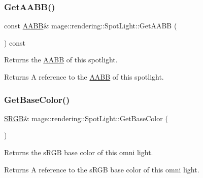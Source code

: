 \subsubsection{\texorpdfstring{Get\+A\+A\+B\+B()}{GetAABB()}}
{\footnotesize\ttfamily const \hyperlink{classmage_1_1_a_a_b_b}{A\+A\+BB}\& mage\+::rendering\+::\+Spot\+Light\+::\+Get\+A\+A\+BB (\begin{DoxyParamCaption}{ }\end{DoxyParamCaption}) const\hspace{0.3cm}{\ttfamily [noexcept]}}

Returns the \hyperlink{classmage_1_1_a_a_b_b}{A\+A\+BB} of this spotlight.

\begin{DoxyReturn}{Returns}
A reference to the \hyperlink{classmage_1_1_a_a_b_b}{A\+A\+BB} of this spotlight. 
\end{DoxyReturn}
\hypertarget{classmage_1_1rendering_1_1_spot_light_a77ad6869c08a8dce505f2fb110c0ee26}{}\label{classmage_1_1rendering_1_1_spot_light_a77ad6869c08a8dce505f2fb110c0ee26} 
\subsubsection{\texorpdfstring{Get\+Base\+Color()}{GetBaseColor()}\hspace{0.1cm}{\footnotesize\ttfamily [1/2]}}
{\footnotesize\ttfamily \hyperlink{structmage_1_1_s_r_g_b}{S\+R\+GB}\& mage\+::rendering\+::\+Spot\+Light\+::\+Get\+Base\+Color (\begin{DoxyParamCaption}{ }\end{DoxyParamCaption})\hspace{0.3cm}{\ttfamily [noexcept]}}

Returns the s\+R\+GB base color of this omni light.

\begin{DoxyReturn}{Returns}
A reference to the s\+R\+GB base color of this omni light. 
\end{DoxyReturn}
\hypertarget{classmage_1_1rendering_1_1_spot_light_a1925cde1ac407d5338439bc63654e41c}{}\label{classmage_1_1rendering_1_1_spot_light_a1925cde1ac407d5338439bc63654e41c} 
